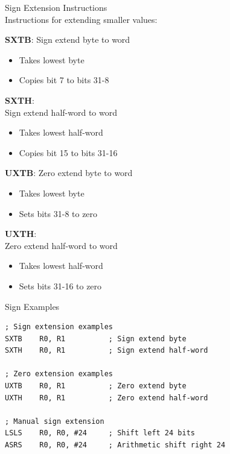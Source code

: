 \begin{concept}{Sign Extension Instructions}\\
Instructions for extending smaller values:

\begin{minipage}{0.5\textwidth}
\textbf{SXTB}: Sign extend byte to word
    \begin{itemize}
      \item Takes lowest byte
      \item Copies bit 7 to bits 31-8
    \end{itemize}
\textbf{SXTH}: \\Sign extend half-word to word
    \begin{itemize}
      \item Takes lowest half-word
      \item Copies bit 15 to bits 31-16
    \end{itemize}
\end{minipage}
\begin{minipage}{0.5\textwidth}
\textbf{UXTB}: Zero extend byte to word
    \begin{itemize}
      \item Takes lowest byte
      \item Sets bits 31-8 to zero
    \end{itemize}
\textbf{UXTH}:\\ Zero extend half-word to word
    \begin{itemize}
      \item Takes lowest half-word
      \item Sets bits 31-16 to zero
    \end{itemize}
\end{minipage}
\end{concept}

\begin{example2}{Sign Examples}
\begin{lstlisting}[language=armasm, style=basesmol]
; Sign extension examples
SXTB    R0, R1          ; Sign extend byte
SXTH    R0, R1          ; Sign extend half-word

; Zero extension examples
UXTB    R0, R1          ; Zero extend byte
UXTH    R0, R1          ; Zero extend half-word

; Manual sign extension
LSLS    R0, R0, #24     ; Shift left 24 bits
ASRS    R0, R0, #24     ; Arithmetic shift right 24
\end{lstlisting}
\end{example2}

